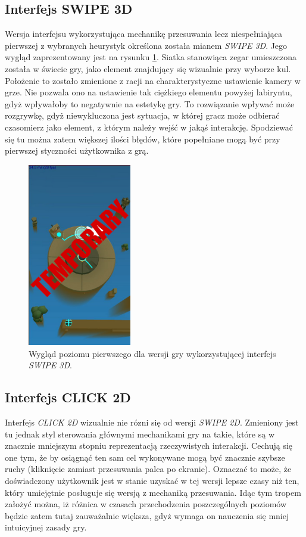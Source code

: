 \documentclass[a4paper,12pt,numbers=noenddot]{report}
\begin{document}
\subsection{Interfejs SWIPE 3D}
Wersja interfejsu wykorzystująca mechanikę przesuwania lecz niespełniająca pierwszej z wybranych heurystyk określona została mianem \textit{SWIPE 3D}. Jego wygląd zaprezentowany jest na rysunku \ref{fig:interface_swipe_3d}. Siatka stanowiąca zegar umieszczona została w świecie gry, jako element znajdujący się wizualnie przy wyborze kul. Położenie to zostało zmienione z racji na charakterystyczne ustawienie kamery w grze. Nie pozwala ono na ustawienie tak ciężkiego elementu powyżej labiryntu, gdyż wpływałoby to negatywnie na estetykę gry. To rozwiązanie wpływać może rozgrywkę, gdyż niewykluczona jest sytuacja, w której gracz może odbierać czasomierz jako element, z którym  należy wejść w jakąś interakcję. Spodziewać się tu można zatem większej ilości błędów, które popełniane mogą być przy pierwszej styczności użytkownika z grą.
\begin{figure}[h!]
	\centering
  	\includegraphics[height=8cm]{fig/tmp.jpg}
	\caption{Wygląd poziomu pierwszego dla wersji gry wykorzystującej interfejs \textit{SWIPE 3D}.}
	\label{fig:interface_swipe_3d}
\end{figure}
\subsection{Interfejs CLICK 2D}
Interfejs \textit{CLICK 2D} wizualnie nie rózni się od wersji \textit{SWIPE 2D}. Zmieniony jest tu jednak styl sterowania głównymi mechanikami gry na takie, które są w znacznie mniejszym stopniu reprezentacją rzeczywistych interakcji. Cechują się one tym, że by osiągnąć ten sam cel wykonywane mogą być znacznie szybsze ruchy (kliknięcie zamiast przesuwania palca po ekranie). Oznaczać to może, że doświadczony użytkownik jest w stanie uzyskać w tej wersji lepsze czasy niż ten, który umiejętnie posługuje się wersją z mechaniką przesuwania. Idąc tym tropem założyć można, iż różnica w czasach przechodzenia poszczególnych poziomów będzie zatem tutaj zauważalnie większa, gdyż wymaga on nauczenia się mniej intuicyjnej zasady gry.
\end{document}
